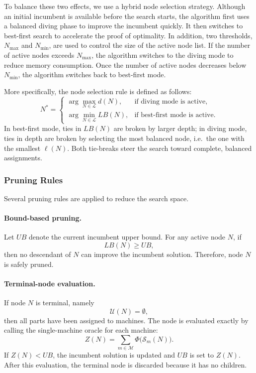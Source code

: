 \documentclass[review,3p,times,authoryear]{elsarticle}
\begin{document}
To balance these two effects, we use a hybrid node selection strategy. Although an initial incumbent is available before the search starts, the algorithm first uses a balanced diving phase to improve the incumbent quickly. It then switches to best-first search to accelerate the proof of optimality. In addition, two thresholds, $N_{\max}$ and $N_{\min}$, are used to control the size of the active node list. If the number of active nodes exceeds $N_{\max}$, the algorithm switches to the diving mode to reduce memory consumption. Once the number of active nodes decreases below $N_{\min}$, the algorithm switches back to best-first mode.

More specifically, the node selection rule is defined as follows:
\[
N^*=
\begin{cases}
	\arg\max_{N\in\mathcal{L}} d(N), & \text{if diving mode is active},\\[1mm]
	\arg\min_{N\in\mathcal{L}} LB(N), & \text{if best-first mode is active}.
\end{cases}
\]
In best-first mode, ties in $LB(N)$ are broken by larger depth; in diving mode, ties in depth are broken by selecting the most balanced node, i.e.\ the one with the smallest $\ell(N)$. Both tie-breaks steer the search toward complete, balanced assignments.

\subsubsection{Pruning Rules}

Several pruning rules are applied to reduce the search space.

\paragraph*{Bound-based pruning.}
Let $UB$ denote the current incumbent upper bound. For any active node $N$,
if
\[
LB(N)\ge UB,
\]
then no descendant of $N$ can improve the incumbent solution. Therefore,
node $N$ is safely pruned.

\paragraph*{Terminal-node evaluation.}
If node $N$ is terminal, namely
\[
\mathcal{U}(N)=\emptyset,
\]
then all parts have been assigned to machines. The node is evaluated exactly
by calling the single-machine oracle for each machine:
\[
Z(N)=
\sum_{m\in\mathcal{M}}
\Phi\bigl(\mathcal{S}_m(N)\bigr).
\]
If $Z(N)<UB$, the incumbent solution is updated and $UB$ is set to $Z(N)$.
After this evaluation, the terminal node is discarded because it has no
children.
\end{document}
